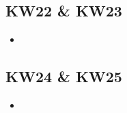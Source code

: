 \subsection{KW22 \& KW23}
\label{ssec:KW22_KW23}
\begin{itemize}
    \item 
\end{itemize}


\subsection{KW24 \& KW25}
\label{ssec:KW24_KW25}
\begin{itemize}
    \item 
\end{itemize}
\newpage




